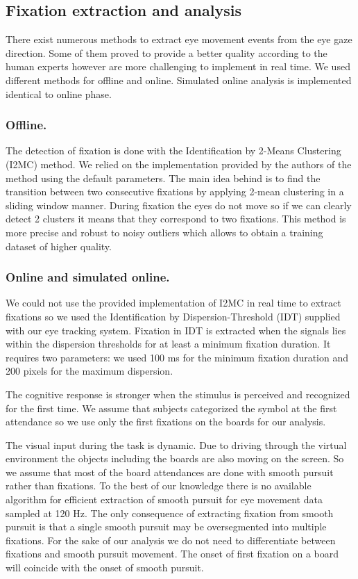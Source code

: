 \documentclass[12pt]{iopart}
\begin{document}
\subsection{Fixation extraction and analysis}
There exist numerous methods to extract eye movement events
from the eye gaze direction. Some of them proved to provide
a better quality according to the human experts
however are more challenging to implement in real time.
We used different methods for offline and online.
Simulated online analysis is implemented identical to online phase.


\subsubsection*{Offline.}
The detection of fixation is done with the Identification by 2-Means Clustering (I2MC) method.
We relied on the implementation provided by the authors of the method
using the default parameters.
The main idea behind is to find the transition between two consecutive fixations
by applying 2-mean clustering in a sliding window manner.
During fixation the eyes do not move so if we can clearly detect
2 clusters it means that they correspond to two fixations.
This method is more precise and robust to noisy outliers which
allows to obtain a training dataset of higher quality.

\subsubsection*{Online and simulated online.}
We could not use the provided implementation of I2MC in real time
to extract fixations so we used the Identification by Dispersion-Threshold (IDT)
supplied with our eye tracking system. Fixation in IDT is extracted
when the signals lies within the dispersion thresholds for at least a minimum fixation duration.
It requires two parameters: we used 100 ms for the minimum fixation duration
and 200 pixels for the maximum dispersion.

The cognitive response is stronger when the stimulus is perceived and recognized
for the first time. We assume that subjects categorized the symbol at the first
attendance so we use only the first fixations on the boards for our analysis.

The visual input during the task is dynamic. Due to driving through
the virtual environment the objects including the boards are also moving on the screen.
So we assume that most of the board attendances are done with
smooth pursuit rather than fixations. 
To the best of our knowledge there is no available algorithm for efficient
extraction of smooth pursuit for eye movement data sampled at 120 Hz.
The only consequence of 
extracting fixation from smooth pursuit is that a single smooth pursuit
may be oversegmented into multiple fixations.
For the sake of our analysis we do not need to differentiate between
fixations and smooth pursuit movement. The onset of first fixation on a board
will coincide with the onset of smooth pursuit.
\end{document}
